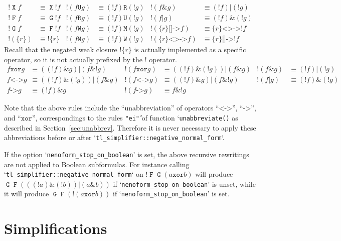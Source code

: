 \documentclass[a4paper,twoside,10pt,DIV=12]{scrreprt}
\DeclareMathOperator{\F}{\texttt{F}}
\DeclareMathOperator{\G}{\texttt{G}}
\newcommand{\U}{\mathbin{\texttt{U}}}
\newcommand{\R}{\mathbin{\texttt{R}}}
\DeclareMathOperator{\X}{\texttt{X}}
\newcommand{\M}{\mathbin{\texttt{M}}}
\newcommand{\W}{\mathbin{\texttt{W}}}
\DeclareMathOperator{\NOT}{\texttt{!}}
\newcommand{\XOR}{\mathbin{\texttt{xor}}}
\newcommand{\IMPLIES}{\mathbin{\texttt{->}}}
\newcommand{\EQUIV}{\mathbin{\texttt{<->}}}
\newcommand{\OR}{\mathbin{\texttt{|}}}
\newcommand{\AND}{\mathbin{\texttt{\&}}}
\newcommand{\0}{\texttt{0}}
\newcommand{\1}{\texttt{1}}
\newcommand{\Esuffix}{\texttt{<>->}}
\newcommand{\Asuffix}{\texttt{[]->}}
\newcommand{\sere}[1]{\texttt{\{}#1\texttt{\}}}
\newcommand{\nsere}[1]{\texttt{!\{}#1\texttt{\}}}
\begin{document}
\begin{align*}
  \NOT\X f & \equiv \X\NOT f &
  \NOT(f \U g) & \equiv (\NOT f) \R (\NOT g) &
  \NOT(f \AND g)&\equiv (\NOT f) \OR (\NOT g)
  \\
  \NOT\F f & \equiv \G\NOT f &
  \NOT(f \R g) & \equiv (\NOT f) \U (\NOT g) &
  \NOT(f \OR g)&\equiv (\NOT f)\AND (\NOT g)
  \\
  \NOT\G f & \equiv \F\NOT f &
  \NOT(f \W g) & \equiv (\NOT f) \M (\NOT g) &
  \NOT(\sere{r} \Asuffix f) &\equiv \sere{r} \Esuffix \NOT f
  \\
  \NOT(\sere{r})&\equiv \nsere{r}&
  \NOT(f \M g) & \equiv (\NOT f) \W (\NOT g)&
  \NOT(\sere{r} \Esuffix f) &\equiv \sere{r} \Asuffix \NOT f
\end{align*}
\noindent Recall that the negated weak closure $\nsere{r}$ is actually
implemented as a specific operator, so it is not actually prefixed by the
$\NOT$ operator.
\begin{align*}
  f \XOR g & \equiv ((\NOT f)\AND g)\OR(f\AND\NOT g) &
  \NOT(f \XOR g) & \equiv ((\NOT f)\AND(\NOT g))\OR(f\AND g) &
  \NOT(f \AND g) & \equiv (\NOT f)\OR(\NOT g) \\
  f \EQUIV g & \equiv ((\NOT f)\AND(\NOT g))\OR(f\AND g) &
  \NOT(f \EQUIV g) & \equiv ((\NOT f)\AND g)\OR(f\AND\NOT g) &
  \NOT(f \OR g) & \equiv (\NOT f)\AND(\NOT g) \\
  f \IMPLIES g & \equiv (\NOT f) \AND g &
  \NOT(f \IMPLIES g) & \equiv f \AND \NOT g
\end{align*}

Note that the above rules include the ``unabbreviation'' of operators
``$\EQUIV$'', ``$\IMPLIES$'', and ``$\XOR$'', correspondings to the
rules \texttt{"ei\^"} of function `\verb=unabbreviate()= as described
in Section~\ref{sec:unabbrev}.  Therefore it is never necessary to
apply these abbreviations before or after
`\verb|tl_simplifier::negative_normal_form|`.

If the option `\verb|nenoform_stop_on_boolean|' is set, the above
recursive rewritings are not applied to Boolean subformulas.  For
instance calling `\verb|tl_simplifier::negative_normal_form|` on
$\NOT\F\G(a \XOR b)$ will produce $\G\F(((\NOT a)\AND(\NOT
b))\OR(a\AND b))$ if `\verb|nenoform_stop_on_boolean|' is unset, while
it will produce $\G\F(\NOT(a \XOR b))$ if
`\verb|nenoform_stop_on_boolean|' is set.

\section{Simplifications}
\end{document}
